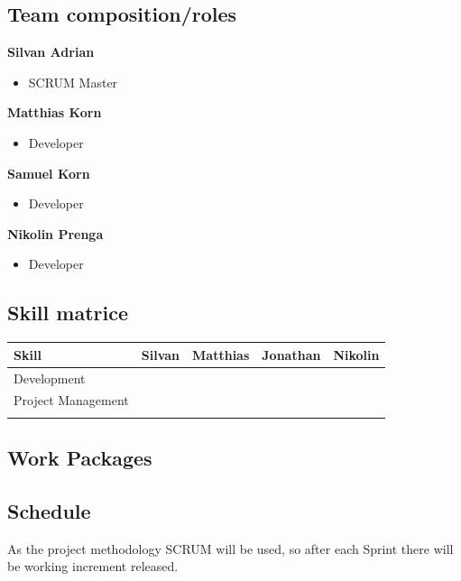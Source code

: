 \documentclass{article}
\begin{document}
\subsection{Team composition/roles}
\textbf{Silvan Adrian}
\begin{itemize}
	\item SCRUM Master %
\end{itemize}
\textbf{Matthias Korn}
\begin{itemize}
	\item Developer
\end{itemize}
\textbf{Samuel Korn}
\begin{itemize}
	\item Developer
\end{itemize}
\textbf{Nikolin Prenga}
\begin{itemize}
	\item Developer
\end{itemize}

\subsection{Skill matrice}
\begin{table}[htb!]
\begin{tabular}{lllll}
 \textbf{Skill}  & \textbf{Silvan} & \textbf{Matthias} & \textbf{Jonathan} & \textbf{Nikolin} \\
\hline
Development       &                 &                   &                   &                  \\
Project Management &                 &                   &                   &                  \\
                  &                 &                   &                   &                 
\end{tabular}
\end{table}

\subsection{Work Packages}

\subsection{Schedule}
As the project methodology SCRUM will be used, so after each Sprint there will be  working increment released.
\end{document}
